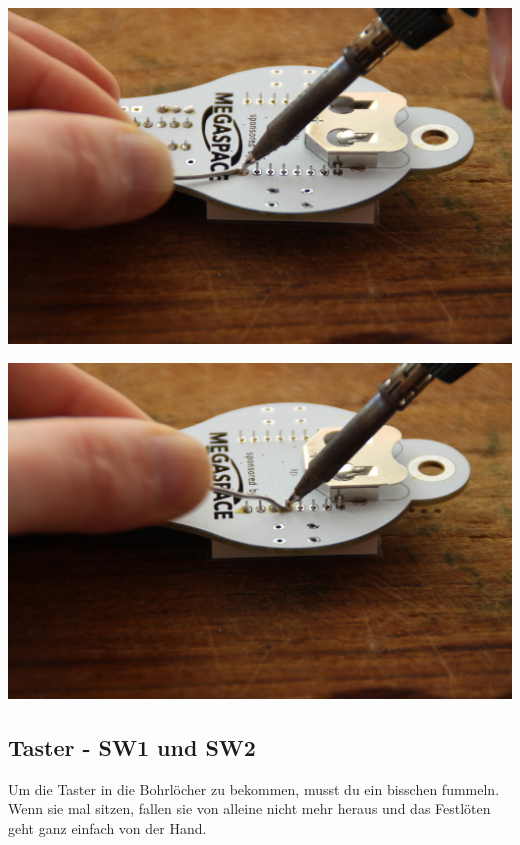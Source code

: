 \documentclass{article}
\begin{document}
\begin{minipage}[b]{0.5\textwidth}
	\includegraphics[width=\textwidth]{Bilder2023/IMG_8376.JPG}
\end{minipage}
\begin{minipage}[b]{0.5\textwidth}
	\includegraphics[width=\textwidth]{Bilder2023/IMG_8377.JPG}
\end{minipage}

\subsection{Taster - SW1 und SW2}

Um die Taster in die Bohrlöcher zu bekommen, musst du ein bisschen fummeln. Wenn sie mal sitzen, fallen sie von alleine nicht mehr heraus und das Festlöten geht ganz einfach von der Hand.
\end{document}
